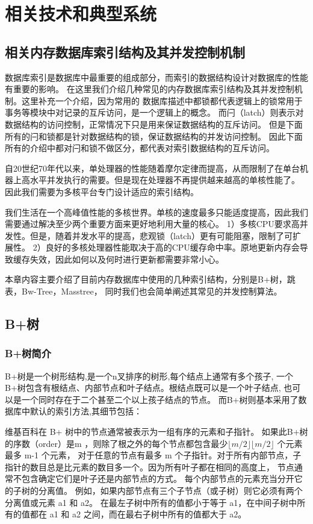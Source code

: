 
\chapter{相关技术和典型系统}

\section{相关内存数据库索引结构及其并发控制机制}
数据库索引是数据库中最重要的组成部分，而索引的数据结构设计对数据库的性能有重要的影响。
在这里我们介绍几种常见的内存数据库索引结构及其并发控制机制。这里补充一个介绍，因为常用的
数据库描述中都锁都代表逻辑上的锁常用于事务等模块中对记录的互斥访问，是一个逻辑上的概念。
而闩（latch）则表示对数据结构的访问控制，正常情况下只是用来保证数据结构的互斥访问。
但是下面所有的闩和锁都是针对数据结构的锁，保证数据结构的并发访问控制。
因此下面所有的介绍中都对闩和锁不做区分，都代表对索引数据结构的互斥访问。

自20世纪70年代以来，单处理器的性能随着摩尔定律而提高，从而限制了在单台机器上高水平并发执行的需要。但是现在处理器不再提供越来越高的单核性能了。
因此我们需要为多核平台专门设计适应的索引结构。

我们生活在一个高峰值性能的多核世界。单核的速度最多只能适度提高，因此我们需要通过解决至少两个重要方面来更好地利用大量的核心。
1）多核CPU要求高并发性。但是，随着并发水平的提高，悲观锁（latch）更有可能阻塞，限制了可扩展性。
2）良好的多核处理器性能取决于高的CPU缓存命中率。原地更新内存会导致缓存失效，因此如何以及何时进行更新都需要非常小心。

本章内容主要介绍了目前内存数据库中使用的几种索引结构，分别是B+树，跳表，Bw-Tree，Masstree，
同时我们也会简单阐述其常见的并发控制算法。

\section{B+树}
\subsection{B+树简介}
B+树\cite{wu2017empirical}是一个树形结构,是一个n叉排序的树形,每个结点上通常有多个孩子,
一个B+树包含有根结点、内部节点和叶子结点。根结点既可以是一个叶子结点,
也可以是一个同时存在于二个甚至二个以上孩子结点的节点。
而B+树则基本采用了数据库中默认的索引方法,其细节包括：

维基百科在 B+ 树中的节点通常被表示为一组有序的元素和子指针。
如果此B+树的序数（order）是m ，则除了根之外的每个节点都包含最少$ {\displaystyle \lfloor m/2\rfloor } \lfloor m/2\rfloor$ 个元素最多 m-1 个元素，
对于任意的节点有最多 m 个子指针。对于所有内部节点，子指针的数目总是比元素的数目多一个。因为所有叶子都在相同的高度上，
节点通常不包含确定它们是叶子还是内部节点的方式。 每个内部节点的元素充当分开它的子树的分离值。
例如，如果内部节点有三个子节点（或子树）则它必须有两个分离值或元素 a1 和 a2。
在最左子树中所有的值都小于等于 a1，在中间子树中所有的值都在 a1 和 a2 之间，而在最右子树中所有的值都大于 a2。

